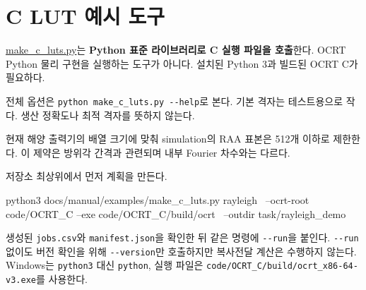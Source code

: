 \chapter{C LUT 예시 도구}
\label{chap:examples_readme}
\href{https://github.com/brtnt/OCRT/blob/main/docs/manual/examples/make_c_luts.py}{make\_c\_luts.py}는 \textbf{Python 표준 라이브러리로 C 실행 파일을 호출}한다. OCRT Python 물리 구현을 실행하는 도구가 아니다. 설치된 Python 3과 빌드된 OCRT C가 필요하다.

전체 옵션은 \texttt{python make\_\allowbreak{}c\_\allowbreak{}luts.\allowbreak{}py -\allowbreak{}-\allowbreak{}help}로 본다. 기본 격자는 테스트용으로 작다. 생산 정확도나 최적 격자를 뜻하지 않는다.

현재 해양 출력기의 배열 크기에 맞춰 simulation의 RAA 표본은 512개 이하로 제한한다. 이 제약은 방위각 간격과 관련되며 내부 Fourier 차수와는 다르다.

저장소 최상위에서 먼저 계획을 만든다.


\begin{ManualCode}
python3 docs/manual/examples/make_c_luts.py rayleigh \
  --ocrt-root code/OCRT_C --exe code/OCRT_C/build/ocrt \
  --outdir task/rayleigh_demo
\end{ManualCode}

생성된 \texttt{jobs.\allowbreak{}csv}와 \texttt{manifest.\allowbreak{}json}을 확인한 뒤 같은 명령에 \texttt{-\allowbreak{}-\allowbreak{}run}을 붙인다. \texttt{-\allowbreak{}-\allowbreak{}run} 없이도 버전 확인을 위해 \texttt{-\allowbreak{}-\allowbreak{}version}만 호출하지만 복사전달 계산은 수행하지 않는다. Windows는 \texttt{python3} 대신 \texttt{python}, 실행 파일은 \texttt{code/\allowbreak{}OCRT\_\allowbreak{}C/\allowbreak{}build/\allowbreak{}ocrt\_\allowbreak{}x86-\allowbreak{}64-\allowbreak{}v3.\allowbreak{}exe}를 사용한다.


